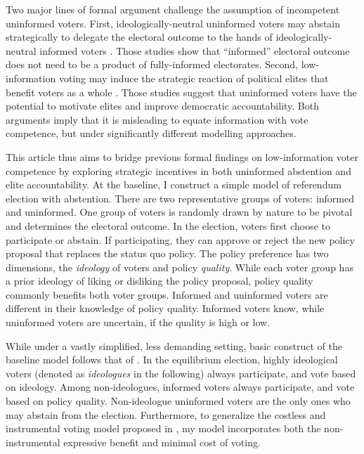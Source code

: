 \documentclass[letterpaper, 12pt]{article}
\begin{document}
    \par Two major lines of formal argument challenge the assumption of incompetent uninformed voters. First, ideologically-neutral uninformed voters may abstain strategically to delegate the electoral outcome to the hands of ideologically-neutral informed voters \citep{Feddersen1996thsw,Feddersen1999abin}. Those studies show that ``informed'' electoral outcome does not need to be a product of fully-informed electorates. Second, low-information voting may induce the strategic reaction of political elites that benefit voters as a whole \citep{Ashworth2014isvo, Prato2016thvo}. Those studies suggest that uninformed voters have the potential to motivate elites and improve democratic accountability. Both arguments imply that it is misleading to equate information with vote competence, but under significantly different modelling approaches.
    
    \par This article thus aims to bridge previous formal findings on low-information voter competence by exploring strategic incentives in both uninformed abstention and elite accountability. At the baseline, I construct a simple model of referendum election with abstention. There are two representative groups of voters: informed and uninformed. One group of voters is randomly drawn by nature to be pivotal and determines the electoral outcome. In the election, voters first choose to participate or abstain. If participating, they can approve or reject the new policy proposal that replaces the status quo policy. The policy preference has two dimensions, the \textit{ideology} of voters and policy \textit{quality}. While each voter group has a prior ideology of liking or disliking the policy proposal, policy quality commonly benefits both voter groups. Informed and uninformed voters are different in their knowledge of policy quality. Informed voters know, while uninformed voters are uncertain, if the quality is high or low.
    
    \par While under a vastly simplified, less demanding setting, basic construct of the baseline model follows that of \cite{Feddersen1996thsw}. In the equilibrium election, highly ideological voters (denoted as \textit{ideologues} in the following) always participate, and vote based on ideology. Among non-ideologues, informed voters always participate, and vote based on policy quality. Non-ideologue uninformed voters are the only ones who may abstain from the election. Furthermore, to generalize the costless and instrumental voting model proposed in \cite{Feddersen1996thsw,Feddersen1999abin}, my model incorporates both the non-instrumental expressive benefit and minimal cost of voting. 
\end{document}
